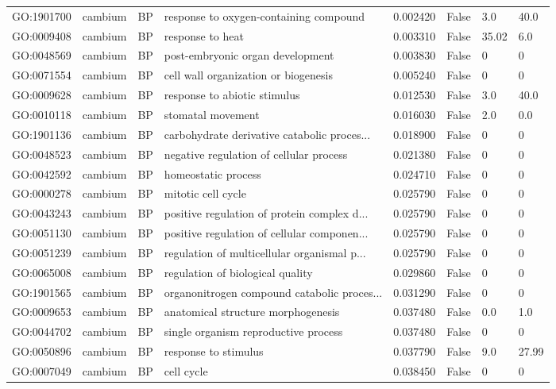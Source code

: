 \begin{longtable}{llllrl}
GO:1901700 & cambium & BP &   response to oxygen-containing compound  & 0.002420 &   False  & 3.0 & 40.0 \\ 
GO:0009408 & cambium & BP &   response to heat  & 0.003310 &   False  & 35.02 & 6.0 \\ 
GO:0048569 & cambium & BP &   post-embryonic organ development  & 0.003830 &   False  & 0 & 0 \\
GO:0071554 & cambium & BP &   cell wall organization or biogenesis  & 0.005240 &   False  & 0 & 0 \\
GO:0009628 & cambium & BP &   response to abiotic stimulus  & 0.012530 &   False  & 3.0 & 40.0 \\ 
GO:0010118 & cambium & BP &   stomatal movement  & 0.016030 &   False  & 2.0 & 0.0 \\ 
GO:1901136 & cambium & BP &   carbohydrate derivative catabolic proces...  & 0.018900 &   False  & 0 & 0 \\
GO:0048523 & cambium & BP &   negative regulation of cellular process  & 0.021380 &   False  & 0 & 0 \\
GO:0042592 & cambium & BP &   homeostatic process  & 0.024710 &   False  & 0 & 0 \\
GO:0000278 & cambium & BP &   mitotic cell cycle  & 0.025790 &   False  & 0 & 0 \\
GO:0043243 & cambium & BP &   positive regulation of protein complex d...  & 0.025790 &   False  & 0 & 0 \\
GO:0051130 & cambium & BP &   positive regulation of cellular componen...  & 0.025790 &   False  & 0 & 0 \\
GO:0051239 & cambium & BP &   regulation of multicellular organismal p...  & 0.025790 &   False  & 0 & 0 \\
GO:0065008 & cambium & BP &   regulation of biological quality  & 0.029860 &   False  & 0 & 0 \\
GO:1901565 & cambium & BP &   organonitrogen compound catabolic proces...  & 0.031290 &   False  & 0 & 0 \\
GO:0009653 & cambium & BP &   anatomical structure morphogenesis  & 0.037480 &   False  & 0.0 & 1.0 \\ 
GO:0044702 & cambium & BP &   single organism reproductive process  & 0.037480 &   False  & 0 & 0 \\
GO:0050896 & cambium & BP &   response to stimulus  & 0.037790 &   False  & 9.0 & 27.99 \\ 
GO:0007049 & cambium & BP &   cell cycle  & 0.038450 &   False  & 0 & 0 \\

\end{longtable}
